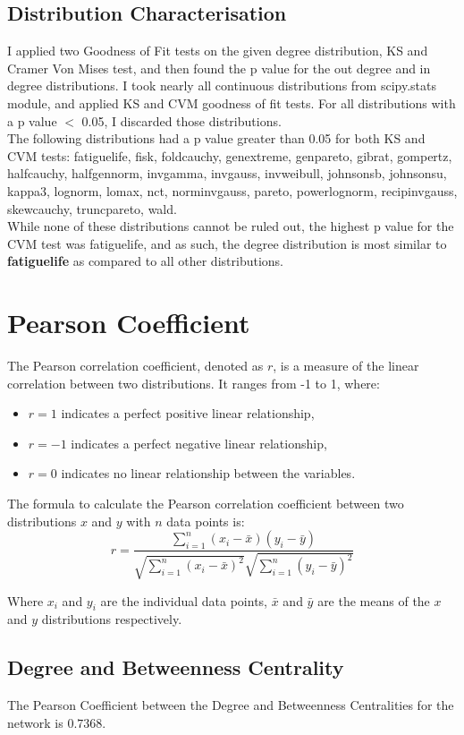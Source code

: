 \documentclass[11pt]{article}
\begin{document}
\subsection{Distribution Characterisation}
I applied two Goodness of Fit tests on the given degree distribution, KS and Cramer Von Mises test, and then found the p value for the out degree and in degree distributions. I took nearly all continuous distributions from scipy.stats module, and applied KS and CVM goodness of fit tests. For all distributions with a p value $<$ 0.05, I discarded those distributions. \\
The following distributions had a p value greater than 0.05 for both KS and CVM tests: fatiguelife, fisk, foldcauchy, genextreme, genpareto, gibrat, gompertz, halfcauchy, halfgennorm, invgamma, invgauss, invweibull, johnsonsb, johnsonsu, kappa3, lognorm, lomax, nct, norminvgauss, pareto, powerlognorm, recipinvgauss, skewcauchy, truncpareto, wald. \\
While none of these distributions cannot be ruled out, the highest p value for the CVM test was fatiguelife, and as such, the degree distribution is most similar to \textbf{fatiguelife} as compared to all other distributions.
\section{Pearson Coefficient}
The Pearson correlation coefficient, denoted as $r$, is a measure of the linear correlation between two distributions. It ranges from -1 to 1, where:
\begin{itemize}
    \item $r = 1$ indicates a perfect positive linear relationship,
    \item $r = -1$ indicates a perfect negative linear relationship,
    \item $r = 0$ indicates no linear relationship between the variables.
\end{itemize}

The formula to calculate the Pearson correlation coefficient between two distributions $x$ and $y$ with $n$ data points is:
$$ r = \frac{{\sum_{i=1}^{n} (x_i - \bar{x})(y_i - \bar{y})}}{{\sqrt{\sum_{i=1}^{n} (x_i - \bar{x})^2} \sqrt{\sum_{i=1}^{n} (y_i - \bar{y})^2}}} $$

Where $x_i$ and $y_i$ are the individual data points, $\bar{x}$ and $\bar{y}$ are the means of the $x$ and $y$ distributions respectively.
\subsection{Degree and Betweenness Centrality}
The Pearson Coefficient between the Degree and Betweenness Centralities for the network is $0.7368$.
\end{document}
